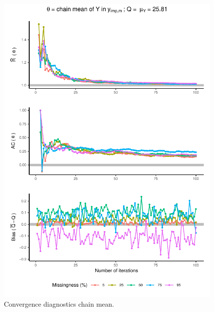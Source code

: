 \documentclass[Royal,times,sageh]{sagej}
\begin{document}
\begin{figure}

{\centering \includegraphics{manuscript_files/figure-latex/mean-1} 

}

\caption{Convergence diagnostics chain mean.}\label{fig:mean}
\end{figure}
\end{document}
